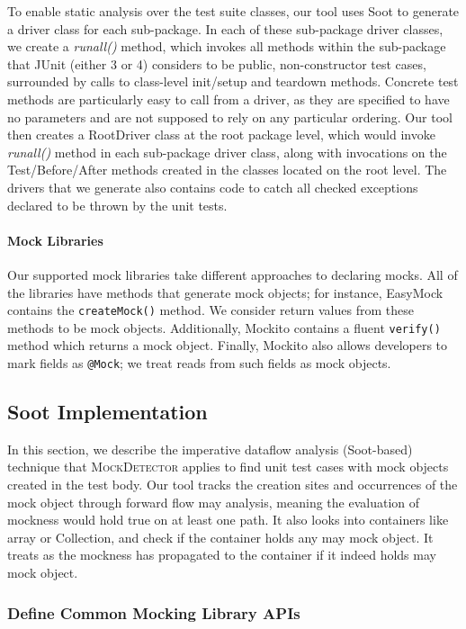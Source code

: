 To enable static analysis over the test suite classes, our tool uses Soot to generate a driver class for each sub-package. In each of these sub-package driver classes, we create a \textit{runall()} method, which invokes all methods within the sub-package that JUnit (either 3 or 4) considers to be public, non-constructor test cases, surrounded by calls to class-level init/setup and teardown methods. Concrete test methods are particularly easy to call from a driver, as they are specified to have no parameters and are not supposed to rely on any particular ordering. 
Our tool then creates a RootDriver class at the root package level, which would invoke \textit{runall()} method in each sub-package driver class, along with invocations on the Test/Before/After methods created in the classes located on the root level. The drivers that we generate also contains code to catch all checked exceptions declared to be thrown by the unit tests.

\paragraph{Mock Libraries}
Our supported mock libraries take different approaches to declaring mocks. All of the libraries have methods that generate mock objects; for instance, EasyMock contains the \texttt{createMock()} method. We consider return values from these methods to be mock objects. Additionally, Mockito contains a fluent \texttt{verify()} method which returns a mock object. Finally, Mockito also allows developers to mark fields as \texttt{@Mock}; we treat reads from such fields as mock objects.

\subsection{Soot Implementation}
In this section, we describe the imperative dataflow analysis (Soot-based) technique that \textsc{MockDetector} applies to find unit test cases with mock objects created in the test body. Our tool tracks the creation sites and occurrences of the mock object through forward flow may analysis, meaning the evaluation of mockness would hold true on at least one path. It also looks into containers like array or Collection, and check if the container holds any may mock object. It treats as the mockness has propagated to the container if it indeed holds may mock object.

\subsubsection{Define Common Mocking Library APIs}
\label{subsubsec:collection}

